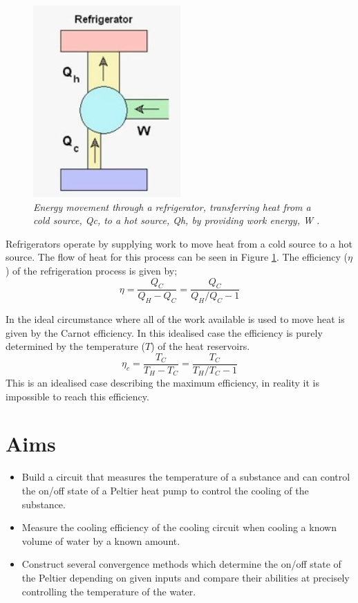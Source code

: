\documentclass[10pt]{article}
\begin{document}
\begin{figure}[h!]
    \centering
    \includegraphics[scale=.75]{ref.jpg}
    \caption{\it{Energy movement through a refrigerator, transferring heat from a cold source, Qc, to a hot source, Qh, by providing work energy, W \cite{fridge}.}}
    \label{fig:fridge}
\end{figure}

Refrigerators operate by supplying work to move heat from a cold source to a hot source. The flow of heat for this process can be seen in Figure \ref{fig:fridge}. The efficiency ($\eta$) of the refrigeration process is given by;
\begin{equation}
    \eta = \frac{Q_C}{Q_H-Q_C}=\frac{Q_C}{Q_H/Q_C - 1}
\end{equation}

In the ideal circumstance where all of the work available is used to move heat is given by the Carnot efficiency\cite{carnot}. In this idealised case the efficiency is purely determined by the temperature ($T$) of the heat reservoirs.
\begin{equation}
        \eta_c = \frac{T_C}{T_H-T_C}=\frac{T_C}{T_H/T_C - 1}
\end{equation}
This is an idealised case describing the maximum efficiency, in reality it is impossible to reach this efficiency. 




\section*{Aims}
\begin{itemize}
    \item Build a circuit that measures the temperature of a substance and can control the on/off state of a Peltier heat pump\cite{peltier} to control the cooling of the substance. 
    \item Measure the cooling efficiency of the cooling circuit when cooling a known volume of water by a known amount.
    \item Construct several convergence methods which determine the on/off state of the Peltier depending on given inputs and compare their abilities at precisely controlling the temperature of the water.
\end{itemize}
\end{document}
